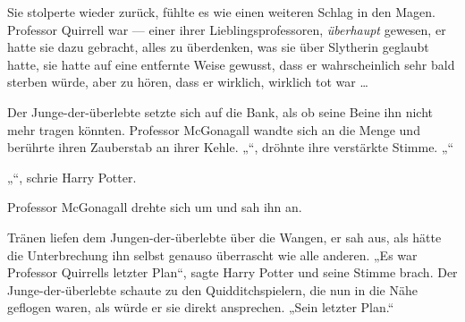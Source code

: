 Sie stolperte wieder zurück, fühlte es wie einen weiteren Schlag in den Magen.
Professor Quirrell war — einer ihrer Lieblingsprofessoren, \emph{überhaupt} gewesen, er hatte sie dazu gebracht, alles zu überdenken, was sie über Slytherin geglaubt hatte, sie hatte auf eine entfernte Weise gewusst, dass er wahrscheinlich sehr bald sterben würde, aber zu hören, dass er wirklich, wirklich tot war …

Der Junge-der-überlebte setzte sich auf die Bank, als ob seine Beine ihn nicht mehr tragen könnten.
Professor McGonagall wandte sich an die Menge und berührte ihren Zauberstab an ihrer Kehle.
„“, dröhnte ihre verstärkte Stimme. „“

„“, schrie Harry Potter.

Professor McGonagall drehte sich um und sah ihn an.

Tränen liefen dem Jungen-der-überlebte über die Wangen, er sah aus, als hätte die Unterbrechung ihn selbst genauso überrascht wie alle anderen.
„Es war Professor Quirrells letzter Plan“, sagte Harry Potter und seine Stimme brach. Der Junge-der-überlebte schaute zu den Quidditchspielern, die nun in die Nähe geflogen waren, als würde er sie direkt ansprechen.
„Sein letzter Plan.“

